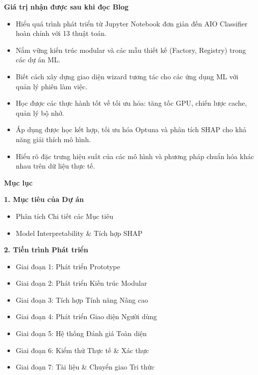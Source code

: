 \documentclass[a4paper,12pt]{article}
\begin{document}
\vspace{1em}
\noindent\textbf{ Giá trị nhận được sau khi đọc Blog}
\begin{itemize}
    \item Hiểu quá trình phát triển từ Jupyter Notebook đơn giản đến AIO Classifier hoàn chỉnh với 13 thuật toán.  
    \item Nắm vững kiến trúc modular và các mẫu thiết kế (Factory, Registry) trong các dự án ML.  
    \item Biết cách xây dựng giao diện wizard tương tác cho các ứng dụng ML với quản lý phiên làm việc.  
    \item Học được các thực hành tốt về tối ưu hóa: tăng tốc GPU, chiến lược cache, quản lý bộ nhớ.  
    \item Áp dụng được học kết hợp, tối ưu hóa Optuna và phân tích SHAP cho khả năng giải thích mô hình.  
    \item Hiểu rõ đặc trưng hiệu suất của các mô hình và phương pháp chuẩn hóa khác nhau trên dữ liệu thực tế.  
\end{itemize}


\vspace{2em}
\noindent
{\Large\bfseries Mục lục}
\vspace{1em}

\noindent
\textbf{1. Mục tiêu của Dự án} \dotfill \pageref{sec:project-goals}
\begin{itemize}
    \item Phân tích Chi tiết các Mục tiêu \dotfill \pageref{subsec:detailed-goals}
    \item Model Interpretability \& Tích hợp SHAP \dotfill \pageref{subsec:model-interpretability}
\end{itemize}

\vspace{0.5em}
\noindent
\textbf{2. Tiến trình Phát triển} \dotfill \pageref{sec:project-evolution}
\begin{itemize}
    \item Giai đoạn 1: Phát triển Prototype \dotfill \pageref{subsec:prototype-stage}
    \item Giai đoạn 2: Phát triển Kiến trúc Modular \dotfill \pageref{subsec:modular-stage}
    \item Giai đoạn 3: Tích hợp Tính năng Nâng cao \dotfill \pageref{subsec:advanced-stage}
    \item Giai đoạn 4: Phát triển Giao diện Người dùng \dotfill \pageref{subsec:ui-stage}
    \item Giai đoạn 5: Hệ thống Đánh giá Toàn diện \dotfill \pageref{subsec:evaluation-stage}
    \item Giai đoạn 6: Kiểm thử Thực tế \& Xác thực \dotfill \pageref{subsec:testing-stage}
    \item Giai đoạn 7: Tài liệu \& Chuyển giao Tri thức \dotfill \pageref{subsec:documentation-stage}
\end{itemize}
\end{document}
